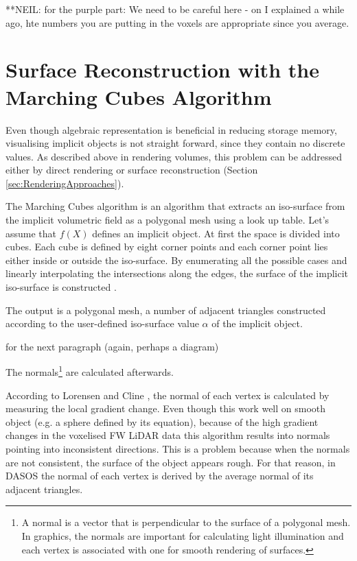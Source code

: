 \documentclass{subfiles}
\begin{document}
{\color{red} **NEIL: for the purple part: We need to be careful here - on I explained a while ago, hte numbers you are putting in the voxels are appropriate since you average. }


\section {Surface Reconstruction with the Marching Cubes Algorithm}\label{sec:SurfaceReconstruction}

\par Even though algebraic representation is beneficial in reducing storage memory, visualising implicit objects is not straight forward, since they contain no discrete values. As described above in rendering volumes, this problem can be addressed either by direct rendering or surface reconstruction (Section \ref{sec:RenderingApproaches}). 

\par The Marching Cubes algorithm is an algorithm that extracts an iso-surface from the implicit volumetric field as a polygonal mesh using a look up table. Let’s assume that $f(X)$ defines an implicit object. At first the space is divided into cubes. Each cube is defined by eight corner points and each corner point lies either inside or outside the iso-surface. By enumerating all the possible cases and linearly interpolating the intersections along the edges, the surface of the implicit iso-surface is constructed \cite{Lorensen1987}. {\color{Fuchsia} The output is a polygonal mesh, a number of adjacent triangles constructed according to the user-defined iso-surface value $\alpha$  of the implicit object.
	
	{\color{red} for the next paragraph (again, perhaps a diagram)}
\par  The normals\footnote{ A normal is a vector that is perpendicular to the surface of a polygonal mesh. In graphics, the normals are important for calculating light illumination and each vertex is associated with one for smooth rendering of surfaces.} are calculated afterwards.} According to Lorensen and Cline \cite{Lorensen1987}, the normal of each vertex is calculated by measuring the local gradient change. Even though this work well on smooth object (e.g. a sphere defined by its equation), because of the high gradient changes in the voxelised FW LiDAR data this algorithm results into normals pointing into inconsistent directions. This is a problem because when the normals are not consistent, the surface of the object appears rough. For that reason, in DASOS the normal of each vertex is derived by the average normal of its adjacent triangles. 
\end{document}
